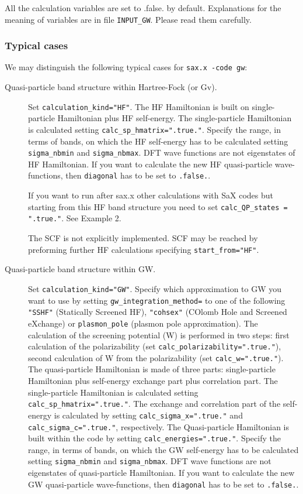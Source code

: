 \documentclass[11pt]{article}
\begin{document}
All the calculation variables are set to .false. by default. Explanations for the meaning of variables are in file \texttt{INPUT\_GW}. Please read them carefully.

\subsubsection{Typical cases}

We may distinguish the following typical cases for \texttt{sax.x -code gw}:

\begin{description}

  \item [Quasi-particle band structure within Hartree-Fock (or Gv).]

    Set \texttt{calculation\_kind="HF"}. The HF Hamiltonian is built on single-particle Hamiltonian plus HF self-energy. The single-particle Hamiltonian is calculated setting \texttt{calc\_sp\_hmatrix=".true."}. Specify the range, in terms of bands, on which the HF self-energy has to be calculated setting \texttt{sigma\_nbmin} and \texttt{sigma\_nbmax}. DFT wave functions are not eigenstates of HF Hamiltonian. If you want to calculate the new HF quasi-particle wave-functions, then \texttt{diagonal} has to be set to \texttt{.false.}.  

    If you want to run after sax.x other calculations with SaX codes but starting from this HF band structure you need to set \texttt{calc\_QP\_states = ".true."}. See Example 2.

The SCF is not explicitly implemented. SCF may be reached by preforming further HF calculations specifying \texttt{start\_from="HF"}. 

  \item [Quasi-particle band structure within GW.]

    Set \texttt{calculation\_kind="GW"}. Specify which 
    approximation to GW you want to use by setting \texttt{gw\_integration\_method=} to one of the following \texttt{"SSHF"} (Statically Screened HF), \texttt{"cohsex"} (COlomb Hole and Screened eXchange) or \texttt{plasmon\_pole} (plasmon pole approximation). The calculation of the screening potential (W) is performed in two steps: first calculation of the polarizability (set \texttt{calc\_polarizability=".true."}), second calculation of W from the polarizability (set \texttt{calc\_w=".true."}). The quasi-particle Hamiltonian is made of three parts: single-particle Hamiltonian plus self-energy exchange part plus correlation part. The single-particle Hamiltonian is calculated setting \texttt{calc\_sp\_hmatrix=".true."}. The exchange and correlation part of the self-energy is calculated by setting \texttt{calc\_sigma\_x=".true."} and \texttt{calc\_sigma\_c=".true."}, respectively. The Quasi-particle Hamiltonian is built within the code by setting \texttt{calc\_energies=".true."}. Specify the range, in terms of bands, on which the GW self-energy has to be calculated setting \texttt{sigma\_nbmin} and \texttt{sigma\_nbmax}. DFT wave functions are not eigenstates of quasi-particle Hamiltonian. If you want to calculate the new GW quasi-particle wave-functions, then \texttt{diagonal} has to be set to \texttt{.false.}.  


\end{description}
\end{document}
